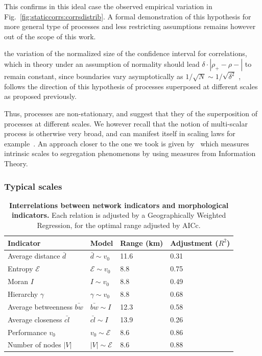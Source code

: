 This confirms in this ideal case the observed empirical variation in Fig.~\ref{fig:staticcorrs:corrsdistrib}. A formal demonstration of this hypothesis for more general type of processes and less restricting assumptions remains however out of the scope of this work.


 the variation of the normalized size of the confidence interval for correlations, which in theory under an assumption of normality should lead $\delta\cdot \left|\rho_+ - \rho -\right|$ to remain constant, since boundaries vary asymptotically as $1/\sqrt{N}\sim 1/\sqrt{\delta^2}$ , follows the direction of this hypothesis of processes superposed at different scales as proposed previously.


Thus, processes are  non-stationary, and  suggest that they  of the superposition of processes at different scales. We however recall that the notion of multi-scalar process is otherwise very broad, and can manifest itself in scaling laws for example~\citep{west2017scale}. An approach closer to the one we took is given by~\cite{Chodrow31102017} which measures intrinsic scales to segregation phenomenons by using measures from Information Theory.





\subsubsection{Typical scales}

\begin{table}[h!]
\caption{\textbf{Interrelations between network indicators and morphological indicators.} Each relation is adjusted by a Geographically Weighted Regression, for the optimal range adjusted by AICc.\label{tab:staticcorrelations:gwr}}
\begin{center}
\begin{tabular}{|l|l|l|l|}
\hline
Indicator & Model & Range (km) & Adjustment ($R^2$) \\ \hline
Average distance $\bar{d}$ & $\bar{d} \sim v_0$ & 11.6 & 0.31 \\
Entropy $\mathcal{E}$  & $\mathcal{E} \sim v_0$ &  8.8  &0.75 \\
Moran $I$ & $I \sim v_0$ & 8.8 & 0.49 \\
Hierarchy $\gamma$ & $\gamma \sim v_0$ & 8.8  & 0.68 \\\hline
Average betweenness $\bar{bw}$ & $\bar{bw} \sim I$ & 12.3 & 0.58 \\
Average closeness $\bar{cl}$ & $\bar{cl}\sim I$ & 13.9 & 0.26 \\
Performance $v_0$ & $v_0 \sim \mathcal{E}$ & 8.6  & 0.86 \\
Number of nodes $\left|V\right|$ & $\left|V\right| \sim \mathcal{E}$ & 8.6  & 0.88 \\\hline
\end{tabular}
\end{center}
\end{table}


